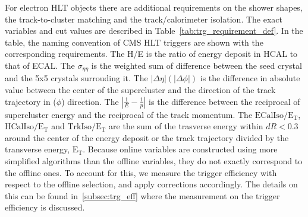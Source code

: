 For electron HLT objects there are additional requirements on
the shower shapes, %
the track-to-cluster matching and 
the track/calorimeter isolation. %
The exact variables and cut values are described in Table~\ref{tab:trg_requirement_def}.
In the table, the naming convention of CMS HLT triggers are shown 
with the corresponding requirements. 
The H/E is the ratio of energy deposit in HCAL to that of ECAL. 
The $\sigma_{\eta\eta}$ is the weighted sum of \Eta{} difference between the 
seed crystal and the 5x5 crystals surrouding it.   
The $|\Delta\eta|(|\Delta\phi|)$ is the difference in absolute value between 
the center of the supercluster and the direction of the track trajectory 
in \Eta($\phi$) direction.   
The $|\frac{1}{E}-\frac{1}{p}|$ is the difference between 
the reciprocal of supercluster energy 
and the reciprocal of the track momentum.  
The $\mathrm{ECalIso/E_T}$, $\mathrm{HCalIso/E_T}$ and $\mathrm{TrkIso/E_T}$ 
are the sum of the trasverse energy within $dR<0.3$ %
around the center of the energy deposit or the track trajectory
divided by the transverse energy, $\mathrm{E_T}$. 
Because online variables are constructed using more simplified algorithms 
than the offline variables, 
they do not exactly correspond to the offline ones. To account for this, we measure 
the trigger efficiency with respect to the offline selection, 
and apply corrections accordingly. 
The details on this can be found in~\ref{subsec:trg_eff} where the 
measurement on the trigger efficiency is discussed.

